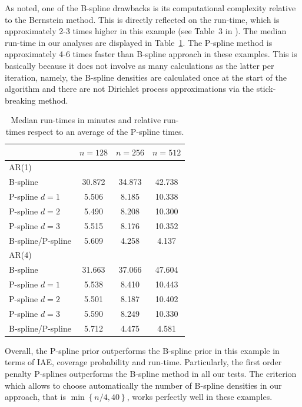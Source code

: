 \documentclass[aps,reprint,amsmath,amssymb,showpacs,showkeys]{revtex4-1}%
\begin{document}

As \cite{Edwards2018} noted, one of the B-spline drawbacks is its computational complexity relative to the Bernstein method.  This is directly reflected on the run-time, which is approximately 2-3 times higher in this example (see Table~3 in \cite{Edwards2018}).  The median run-time in our analyses are displayed in Table~\ref{table:sim_time}.  The P-spline method is approximately 4-6 times faster than B-spline approach in these examples.  This is basically because it does not involve as many calculations as the latter per iteration, namely, the B-spline densities are calculated once at the start of the algorithm and there are not Dirichlet process approximations via the stick-breaking method.  

\begin{table}
	\centering
	\begin{ruledtabular}
	\begin{tabular}{lccc}
		\toprule
		          & $n=128$ & $n=256$ & $n=512$ \\ \hline
		AR(1)     &  &  &  \\ 
		B-spline &   30.872 & 34.873 & 42.738 \\
		P-spline $d=1$& 5.506 & 8.185 & 10.338 \\
		P-spline $d=2$& 5.490 & 8.208 & 10.300 \\
		P-spline $d=3$& 5.515 & 8.176 & 10.352 \\ 
		B-spline/P-spline & 5.609 & 4.258 & 4.137 \\ \hline
		AR(4)     &  &  & \\ 
		B-spline & 31.663 & 37.066 & 47.604  \\
		P-spline $d=1$ & 5.538 & 8.410 & 10.443  \\
		P-spline $d=2$&5.501 & 8.187 & 10.402 \\
		P-spline $d=3$& 5.590 & 8.249 & 10.330  \\	
		B-spline/P-spline & 5.712 & 4.475 & 4.581 \\	
		\bottomrule
	\end{tabular}
	\end{ruledtabular}
	\caption{Median run-times in minutes and relative run-times respect to an average of the P-spline times.}
	\label{table:sim_time}
\end{table}

Overall, the P-spline prior outperforms the B-spline prior in this example in terms of IAE, coverage probability and run-time.  Particularly, the first order penalty P-splines outperforms the B-spline method in all our tests.  The criterion which allows to choose automatically the number of B-spline densities in our approach, that is $\min\left\{n/4, 40\right\}$, works perfectly well in these examples. 
\end{document}
